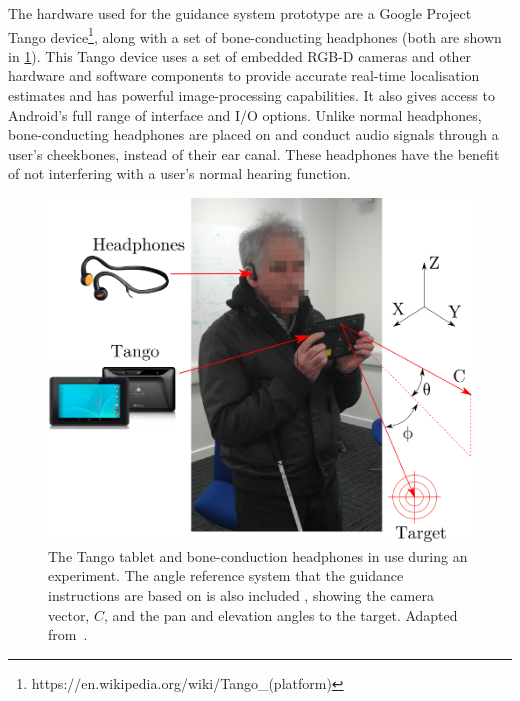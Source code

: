 \documentclass[acmsmall]{acmart}
\begin{document}
The hardware used for the guidance system prototype are a Google Project Tango device\footnote{https://en.wikipedia.org/wiki/Tango\_(platform)}, along with a set of bone-conducting headphones (both are shown in \cref{fig:participant}).
This Tango device uses a set of embedded RGB-D cameras and other hardware and software components to provide accurate real-time localisation estimates and has powerful image-processing capabilities.
It also gives access to Android's full range of interface and I/O options.
Unlike normal headphones, bone-conducting headphones are placed on and conduct audio signals through a user's cheekbones, instead of their ear canal.
These headphones have the benefit of not interfering with a user's normal hearing function.

\begin{figure}
  \centering
  \includegraphics[width=0.65\columnwidth]{figures/vi_participant_e.png}
  \caption{The Tango tablet and bone-conduction headphones in use during an experiment. The angle reference system that the guidance instructions are based on is also included , showing the camera vector, $C$, and the pan and elevation angles to the target. Adapted from~\citet{lock2019bone}.}\label{fig:participant}
\end{figure}
\end{document}
